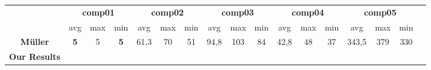 \begin{table}[h!]
\centering
\footnotesize
\begin{tabular}{ccccccccccccccccc}
\hline
& \multicolumn{3}{c}{\textbf{comp01}} & \multicolumn{3}{c}{\textbf{comp02}} & \multicolumn{3}{c}{\textbf{comp03}} & \multicolumn{3}{c}{\textbf{comp04}} & \multicolumn{3}{c}{\textbf{comp05}} \\
& avg & max & min & avg & max & min & avg & max & min & avg & max & min & avg & max & min \\
\textbf{Müller} & \textbf{5} & 5 & \textbf{5} & 61,3 & 70 & 51 & 94,8 & 103 & 84 & 42,8 & 48 & 37 & 343,5 & 379 & 330 \\
\textbf{Our Results} & & & & & & & & & & & & & & & \\
\end{tabular}


\end{table}
